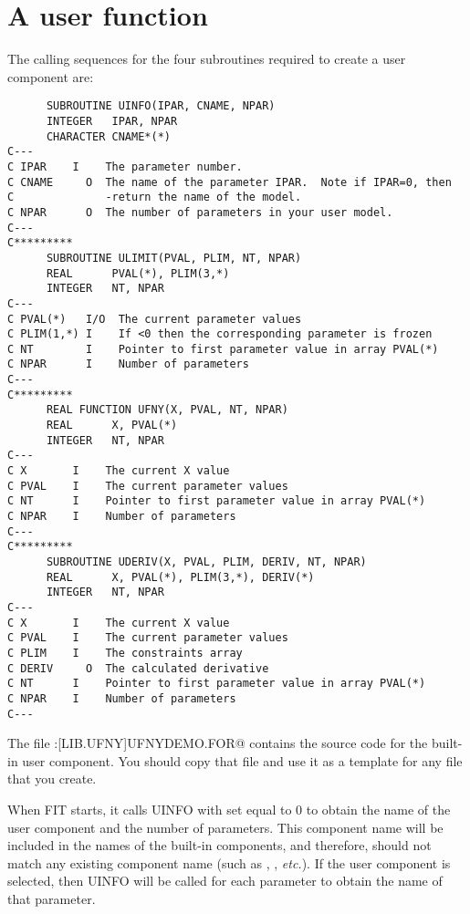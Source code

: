 \pagebreak
\section{A user function}
The calling sequences for the four subroutines required to create
a user component are:
\medskip
\begin{verbatim}
      SUBROUTINE UINFO(IPAR, CNAME, NPAR)
      INTEGER   IPAR, NPAR
      CHARACTER CNAME*(*)
C---
C IPAR    I    The parameter number.
C CNAME     O  The name of the parameter IPAR.  Note if IPAR=0, then
C              -return the name of the model.
C NPAR      O  The number of parameters in your user model.
C---
C*********
      SUBROUTINE ULIMIT(PVAL, PLIM, NT, NPAR)
      REAL      PVAL(*), PLIM(3,*)
      INTEGER   NT, NPAR
C---
C PVAL(*)   I/O  The current parameter values
C PLIM(1,*) I    If <0 then the corresponding parameter is frozen
C NT        I    Pointer to first parameter value in array PVAL(*)
C NPAR      I    Number of parameters
C---
C*********
      REAL FUNCTION UFNY(X, PVAL, NT, NPAR)
      REAL      X, PVAL(*)
      INTEGER   NT, NPAR
C---
C X       I    The current X value
C PVAL    I    The current parameter values
C NT      I    Pointer to first parameter value in array PVAL(*)
C NPAR    I    Number of parameters
C---
C*********
      SUBROUTINE UDERIV(X, PVAL, PLIM, DERIV, NT, NPAR)
      REAL      X, PVAL(*), PLIM(3,*), DERIV(*)
      INTEGER   NT, NPAR
C---
C X       I    The current X value
C PVAL    I    The current parameter values
C PLIM    I    The constraints array
C DERIV     O  The calculated derivative
C NT      I    Pointer to first parameter value in array PVAL(*)
C NPAR    I    Number of parameters
C---
\end{verbatim}
\newpage

The file \verb@XANADU:[LIB.UFNY]UFNYDEMO.FOR@ contains the source
code for the built-in \verb@DEMO@ user component.  You should copy
that file and use it as a template for any file that you create.

When FIT starts, it calls UINFO with \verb@IPAR@ set equal to 0 to
obtain the
name of the user component and the number of parameters.  This component
name will be included in the names of the built-in components, and
therefore, should not match any existing component name (such as \verb@CONS@,
\verb@LINE@, {\it etc.}).  If the user component is selected, then UINFO
will be called for each parameter to obtain the name of that parameter.

